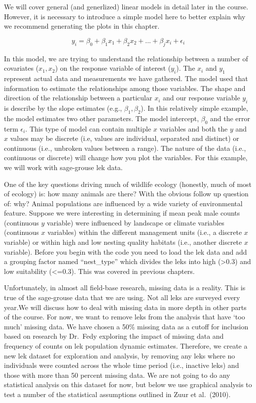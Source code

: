 \documentclass[
]{book}
\begin{document}
We will cover general (and generlized) linear models in detail later in the course. However, it is necessary to introduce a simple model here to better explain why we recommend generating the plots in this chapter.

\[y_i = \beta_0 + \beta_1x_1 + \beta_2x_2 +  ...+ \beta_jx_i + \epsilon_i\]

In this model, we are trying to understand the relationship between a number of covariates (\(x_1, x_2\)) on the response variable of interest (\(y_i\)). The \(x_i\) and \(y_1\) represent actual data and measurements we have gathered. The model used that information to estimate the relationships among those variables. The shape and direction of the relationship between a particular \(x_i\) and our response variable \(y_i\) is describe by the slope estimates (e.g., \(\beta_1, \beta_2\)). In this relatively simple example, the model estimates two other parameters. The model intercept, \(\beta_0\) and the error term \(\epsilon_i\). This type of model can contain multiple \(x\) variables and both the \(y\) and \(x\) values may be discrete (i.e, values are individual, separated and distinct) or continuous (i.e., unbroken values between a range). The nature of the data (i.e., continuous or discrete) will change how you plot the variables. For this example, we will work with sage-grouse lek data.

One of the key questions driving much of wildlife ecology (honestly, much of most of ecology) is: how many animals are there? With the obvious follow up question of: why? Animal populations are influenced by a wide variety of environmental feature. Suppose we were interesting in determining if mean peak male counts (continuous \(y\) variable) were influenced by landscape or climate variables (continuous \(x\) variables) within the different management units (i.e., a discrete \(x\) variable) or within high and low nesting quality habitats (i.e., another discrete \(x\) variable). Before you begin with the code you need to load the lek data and add a grouping factor named ``nest\_type'' which divides the leks into high (\textgreater0.3) and low suitability (\textless=0.3). This was covered in previous chapters.

Unfortunately, in almost all field-base research, missing data is a reality. This is true of the sage-grouse data that we are using. Not all leks are surveyed every year.We will discuss how to deal with missing data in more depth in other parts of the course. For now, we want to remove leks from the analysis that have `too much' missing data. We have chosen a 50\% missing data as a cutoff for inclusion based on research by Dr.~Fedy exploring the impact of missing data and frequency of counts on lek population dynamic estimates. Therefore, we create a new lek dataset for exploration and analysis, by removing any leks where no individuals were counted across the whole time period (i.e., inactive leks) and those with more than 50 percent missing data. We are not going to do any statistical analysis on this dataset for now, but below we use graphical analysis to test a number of the statistical assumptions outlined in Zuur et al.~(2010).
\end{document}
